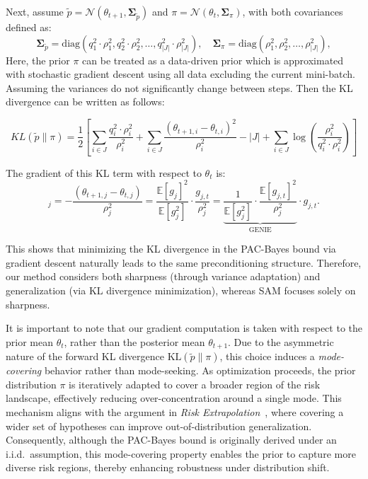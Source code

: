 \documentclass{article}
\theoremstyle{plain}
\theoremstyle{definition}
\theoremstyle{remark}
\begin{document}
Next, assume \( \tilde{p} = \mathcal{N}(\theta_{t+1}, \mathbf{\Sigma}_{\tilde{p}}) \) and \( \pi = \mathcal{N}(\theta_t, \mathbf{\Sigma}_{\pi}) \), with both covariances defined as:
\[
\mathbf{\Sigma}_{\tilde{p}} = \text{diag}(q_1^2\cdot\rho_{1}^2, q_2^2\cdot\rho_{2}^2, \dots, q_{|J|}^2\cdot\rho_{|J|}^2), \quad 
\mathbf{\Sigma}_{\pi} = \text{diag}(\rho_{1}^2, \rho_{2}^2, \dots, \rho_{|J|}^2),
\]
Here, the prior $\pi$ can be treated as a data-driven prior which is approximated with stochastic gradient descent using all data excluding the current mini-batch. Assuming the variances do not significantly change between steps. Then the KL divergence can be written as follows:

\begin{equation}
KL(\tilde{p}  \| \mathcal{\pi}) = \frac{1}{2} \left[ 
\sum_{i \in J} \frac{q_i^2\cdot \rho_{i}^2}{\rho_{i}^2} 
+ \sum_{i \in J} \frac{(\theta_{t+1,i} - \theta_{t,i})^2}{ \rho_{i}^2} 
- |J| + \sum_{i \in J} \log \left( \frac{ \rho_{i}^2}{q_i^2\cdot \rho_{i}^2} \right) 
\right] 
\end{equation}



The gradient of this KL term with respect to \(  \theta_t \) is:
\begin{equation}
[\nabla_{\theta_t} KL(\tilde{p} \| \pi)]_j 
= -\frac{(\theta_{t+1,j} - \theta_{t,j})}{\rho_j^2}
= \frac{\mathbb{E}[g_j]^2}{\mathbb{E}[g_j^2]} \cdot \frac{g_{j,t}}{\rho_j^2}
= \underbrace{\frac{1}{\mathbb{E}[g_j^2]} \cdot \frac{\mathbb{E}[g_{j,t}]^2}{\rho_j^2}}_{\text{GENIE}} \cdot g_{j,t}.
\end{equation}


This shows that minimizing the KL divergence in the PAC-Bayes bound via gradient descent naturally leads to the same preconditioning structure. Therefore, our method considers both sharpness (through variance adaptation) and generalization (via KL divergence minimization), whereas SAM focuses solely on sharpness.

It is important to note that our gradient computation is taken with respect to the prior mean $\theta_t$, rather than the posterior mean $\theta_{t+1}$. 
Due to the asymmetric nature of the forward KL divergence $\mathrm{KL}(\tilde{p} \| \pi)$, this choice induces a \textit{mode-covering} behavior rather than mode-seeking. 
As optimization proceeds, the prior distribution $\pi$ is iteratively adapted to cover a broader region of the risk landscape, effectively reducing over-concentration around a single mode. 
This mechanism aligns with the argument in \emph{Risk Extrapolation}~\cite{vrex}, where covering a wider set of hypotheses can improve out-of-distribution generalization. 
Consequently, although the PAC-Bayes bound is originally derived under an i.i.d.\ assumption, this mode-covering property enables the prior to capture more diverse risk regions, thereby enhancing robustness under distribution shift.
\end{document}
